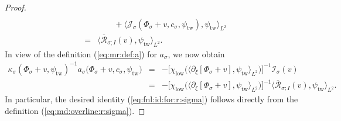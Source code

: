 \documentclass[10pt]{articleHJ}
\newcommand{\sref}[1]{(\ref{#1})}                       %
\numberwithin{equation}{section}
\begin{document}
\begin{proof}
\begin{equation}
\begin{array}{lcl}
\\[0.2cm]
& & \qquad
+ \langle \mathcal{J}_{\sigma}
  (\Phi_{\sigma} + v, c_{\sigma} , \psi_{\mathrm{tw}}),
 \psi_{\mathrm{tw}} \rangle_{L^2}
\\[0.2cm]
& = &
  \langle \overline{\mathcal{R}}_{\sigma;I}(v),
   \psi_{\mathrm{tw}} \rangle_{L^2} .
\end{array}
\end{equation}
In view
of the definition
\sref{eq:mr:def:a}
for $a_{\sigma}$,
we now obtain
\begin{equation}
\begin{array}{lcl}
\kappa_{\sigma}(\Phi_{\sigma}+ v, \psi_{\mathrm{tw}})^{-1}
a_{\sigma}\big(\Phi_{\sigma} + v ,
c_{\sigma}, \psi_{\mathrm{tw}} \big)
& = &
  - \Big[\chi_{\mathrm{low}}\big(\langle\partial_\xi[\Phi_{\sigma} + v ] ,
    \psi_{\mathrm{tw}} \rangle_{L^2} \big)\Big]^{-1}
  \mathcal{I}_{\sigma}(v)
\\[0.2cm]
& = &
  - \Big[\chi_{\mathrm{low}}\big(\langle\partial_\xi[\Phi_{\sigma} + v ] ,
    \psi_{\mathrm{tw}} \rangle_{L^2} \big)\Big]^{-1}
   \langle
      \overline{\mathcal{R}}_{\sigma;I}(v),
          \psi_{\mathrm{tw}}
   \rangle_{L^2} .
\end{array}
\end{equation}
In particular, the desired
identity
\sref{eq:fnl:id:for:r:sigma}
follows directly
from the definition
\sref{eq:md:overline:r:sigma}.
\end{proof}
\end{document}
